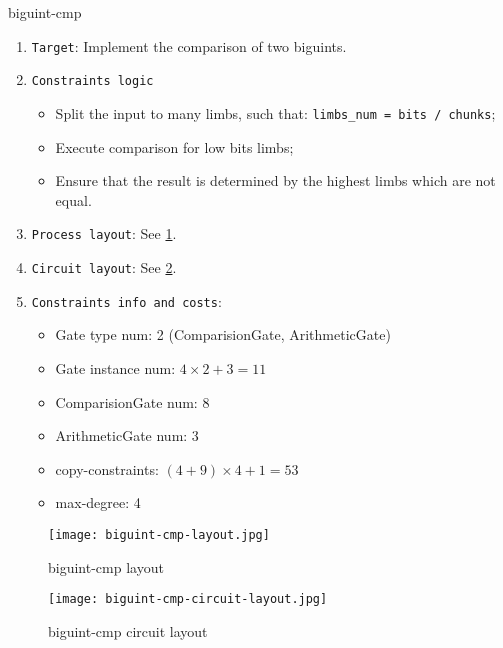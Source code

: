 {biguint-cmp}

\begin{enumerate}
    \item \verb|Target|: Implement the comparison of two biguints.
    \item \verb|Constraints logic|
    \begin{itemize}
        \item Split the input to many limbs, such that: \verb|limbs_num = bits / chunks|;
        \item Execute comparison for low bits limbs;
        \item Ensure that the result is determined by the highest limbs which are not equal.
    \end{itemize}
    \item \verb|Process layout|: See \ref{fig:biguint-cmp-layout}.
    \item \verb|Circuit layout|: See \ref{fig:biguint-cmp-circuit-layout}.
    \item \verb|Constraints info and costs|:
    \begin{itemize}
        \item Gate type num: 2 (ComparisionGate, ArithmeticGate)
        \item Gate instance num: $4 \times 2 + 3 = 11$
        \item ComparisionGate num: 8
        \item ArithmeticGate num: 3
        \item copy-constraints: $(4 + 9) \times 4 + 1 = 53$
        \item max-degree: 4
    \end{itemize}
\end{enumerate}

\begin{figure}[!ht]
    \centering
    \texttt{[image: biguint-cmp-layout.jpg]}
    \caption{biguint-cmp layout}
    \label{fig:biguint-cmp-layout}
\end{figure}

\begin{figure}[!ht]
    \centering
    \texttt{[image: biguint-cmp-circuit-layout.jpg]}
    \caption{biguint-cmp circuit layout}
    \label{fig:biguint-cmp-circuit-layout}
\end{figure}